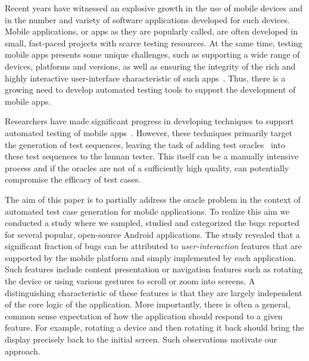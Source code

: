 \label{introduction}

Recent years have witnessed an explosive growth in the use of mobile devices and in the number and variety of software applications developed for such devices. Mobile applications, or apps as they are popularly called, are often developed in small, fast-paced projects with scarce testing resources. At the same time, testing mobile apps presents some unique challenges, such as supporting a wide range of devices, platforms and versions, as well as ensuring the integrity of the rich and highly interactive user-interface characteristic of such apps~\cite{MobileDev:IBMWhitePaper}. Thus, there is a growing need to develop automated testing tools to support the development of mobile apps.

Researchers have made significant progress in developing techniques to support automated testing of mobile apps~\cite{Nguyen:2012:ISSTA, AnandFSE2012, AmalfitanoASE2012, Joorabchi:2012:WCRE, collider2013}. However, these techniques primarily target the generation of test sequences, leaving the task of adding test oracles~\cite{Oracle:Howden78, Weyuker80} into these test sequences to the human tester. This itself can be a manually intensive process and if the oracles are not of a sufficiently high quality, can potentially compromise the efficacy of test cases.

The aim of this paper is to partially address the oracle problem in the context of automated test case generation for mobile applications. To realize this aim we conducted a study where we sampled, studied and categorized the bugs reported for several popular, open-source Android applications. The study revealed that a significant fraction of bugs can be attributed to \emph{user-interaction} features that are supported by the mobile platform and simply implemented by each application. Such features include content presentation or navigation features such as rotating the device or using various gestures to scroll or zoom into screens. A distinguishing characteristic of these features is that they are largely independent of the core logic of the application. More importantly, there is often a general, common sense expectation of how the application should respond to a given feature. For example, rotating a device and then rotating it back should bring the display precisely back to the initial screen. Such observations motivate our approach.

